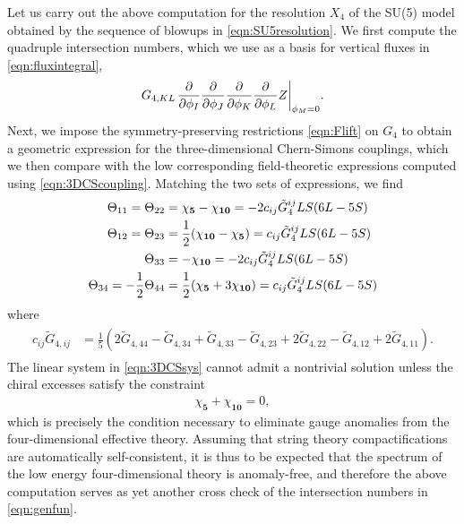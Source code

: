 \documentclass[11pt,oneside,english]{article}
\numberwithin{equation}{section}
\let\originalleft\left
\let\originalright\right
\renewcommand*{\left}{\mathopen{}\mathclose\bgroup\originalleft}
\renewcommand*{\right}{\aftergroup\egroup\originalright}
\theoremstyle{definition}
\begin{document}
Let us carry out the above computation for the resolution $X_4$ of the SU(5) model obtained by the sequence of blowups in \cref{eqn:SU5resolution}. We first compute the quadruple intersection numbers, which we use as a basis for vertical fluxes in \cref{eqn:fluxintegral},
	\begin{align}
		G_{4,KL}\left. \frac{\partial}{\partial \phi_I}  \frac{\partial}{\partial \phi_J}  \frac{\partial}{\partial \phi_K}  \frac{\partial}{\partial \phi_L} Z \right|_{\phi_M = 0}.
	\end{align}
Next, we impose the symmetry-preserving restrictions \cref{eqn:Flift} on $G_4$ to obtain a geometric expression for the three-dimensional Chern-Simons couplings, which we then compare with the low corresponding field-theoretic expressions computed using \cref{eqn:3DCScoupling}. Matching the two sets of expressions, we find 
	\begin{align}
		\begin{split}
		\label{eqn:3DCSsys}
			\Theta_{11} =\Theta_{22}&=\chi_{\textbf{5}}- \chi_{\textbf{10}} =- 2 c_{ij} \tilde G_4^{ij} L  S  (6L - 5 S) \\
			\Theta_{12}=\Theta_{23}&=\frac{1}{2} (\chi_{\textbf{10} } -\chi_{\textbf{5}}) = c_{ij} \tilde G_4^{ij} L  S  (6L - 5 S) \\
			\Theta_{33}& = - \chi_{\textbf{10}} = - 2 c_{ij} \tilde G_4^{ij} L  S  (6L - 5 S) \\
			\Theta_{34} = -\frac{1}{2} \Theta_{44} &= \frac{1}{2} (\chi_{\textbf 5} + 3 \chi_{\textbf{10}}) =c_{ij} \tilde G_4^{ij} L  S  (6L - 5 S)
				\end{split}
	\end{align}
where 
	\begin{align}
		\begin{split}
		c_{ij} \tilde G_{4,ij} &=\frac{1}{5}(2 \tilde G_{4,44} - \tilde G_{4,34} + \tilde G_{4,33} - \tilde G_{4,23} + 2 \tilde G_{4,22} - \tilde G_{4,12} + 2 \tilde G_{4,11}).
		\end{split}
	\end{align}
The linear system in \cref{eqn:3DCSsys} cannot admit a nontrivial solution unless the chiral excesses satisfy the constraint
	\begin{align}
		\chi_{\textbf{5}} + \chi_{\textbf{10}} = 0,
	\end{align}
which is precisely the condition necessary to eliminate gauge anomalies from the four-dimensional effective theory. Assuming that string theory compactifications are automatically self-consistent, it is thus to be expected that the spectrum of the low energy four-dimensional theory is anomaly-free, and therefore the above computation serves as yet another cross check of the intersection numbers in \cref{eqn:genfun}. 
\end{document}
